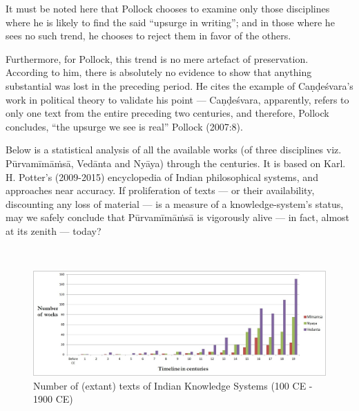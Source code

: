 It must be noted here that Pollock chooses to examine only those disciplines where he is likely to find the said “upsurge in writing”; and in those where he sees no such trend, he chooses to reject them in favor of the others.

Furthermore, for Pollock, this trend is no mere artefact of preservation. According to him, there is absolutely no evidence to show that anything substantial was lost in the preceding period. He cites the example of Caṇḍeśvara’s work in political theory to validate his point — Caṇḍeśvara, apparently, refers to only one text from the entire preceding two centuries, and therefore, Pollock concludes, “the upsurge we see is real” Pollock (2007:8).

Below is a statistical analysis of all the available works (of three disciplines viz. Pūrvamīmāṁsā, Vedānta and Nyāya) through the centuries. It is based on Karl. H. Potter’s (2009-2015) encyclopedia of Indian philosophical systems, and approaches near accuracy. If proliferation of texts — or their availability, discounting any loss of material — is a measure of a knowledge-system’s status, may we safely conclude that Pūrvamīmāṁsā is vigorously alive — in fact, almost at its zenith — today?   

\begin{landscape}
~\phantom{a}
\vfill
\begin{figure}[H]
\centering
\includegraphics[scale=0.32]{figures/fig1.png}
\caption{Number of (extant) texts of Indian Knowledge Systems (100 CE - 1900 CE)}\label{chap2-fig1}
\end{figure}
\vfill
~\phantom{a}
\end{landscape}



